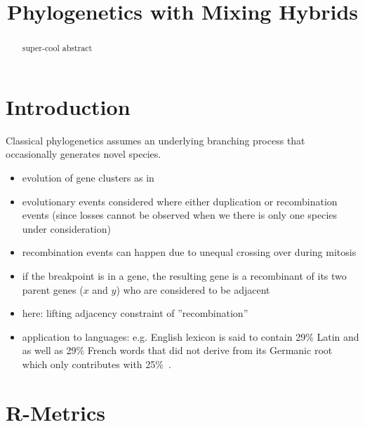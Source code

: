 \documentclass{article}
\begin{document}
\title{Phylogenetics with Mixing Hybrids}

\maketitle


\begin{abstract}
  super-cool abstract
\end{abstract}

\section{Introduction}

Classical phylogenetics assumes an underlying branching process that
occasionally generates novel species. 



\begin{itemize}
\item evolution of gene clusters as in~\cite{Prohaska:17a}
 \item evolutionary events considered where either duplication 
 or recombination events (since losses cannot be observed when 
 we there is only one species under consideration)
 \item recombination events can happen due to unequal crossing
 over during mitosis
 \item if the breakpoint is in a gene, the resulting gene is
 a recombinant of its two parent genes ($x$ and $y$) who are
 considered to be adjacent
 \item here: lifting adjacency constraint of ''recombination''
 \item application to languages: e.g. English lexicon is said
 to contain 29\% Latin and as well as 29\% French words that 
 did not derive from its Germanic root which only contributes 
 with 25\%~\cite{Finkenstaedt:73}.
\end{itemize}


\section{R-Metrics} 
\end{document}
